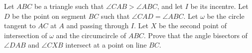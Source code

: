 Let $ABC$ be a triangle such that $\angle{CAB}>\angle{ABC}$, and let $I$ be its incentre. Let $D$ be the point on segment $BC$ such that $\angle{CAD}=\angle{ABC}$. Let $\omega$ be the circle tangent to $AC$ at $A$ and passing through $I$. Let $X$ be the second point of intersection of $\omega$ and the circumcircle of $ABC$. Prove that the angle bisectors of $\angle{DAB}$ and $\angle{CXB}$ intersect at a point on line $BC$.